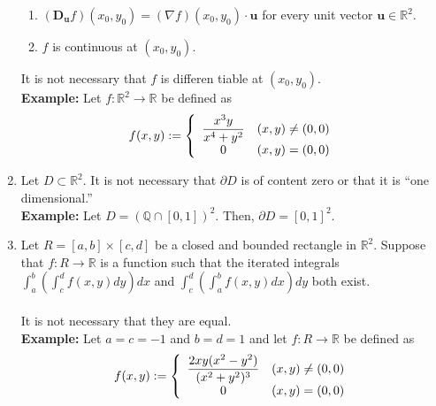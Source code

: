 \documentclass{article}
\begin{document}
\begin{enumerate}
\begin{enumerate}[nosep]
		\item $(\mathbf{D_u}f)(x_0, y_0) = (\nabla f)(x_0, y_0)\cdot\mathbf{u}$ for every unit vector $\mathbf{u} \in \mathbb{R}^2.$
		\item $f$ is continuous at $(x_0, y_0).$
	\end{enumerate}
	It is not necessary that $f$ is differen		tiable at $(x_0, y_0).$\\
	\textbf{Example:} Let $f:\mathbb{R}^2 \to \mathbb{R}$ be defined as
	\[f(x, y) := \left\{
	\begin{array}{c c}
		\dfrac{x^3y}{x^4 + y^2} & (x, y) \neq (0, 0)\\
		0 & (x, y) = (0, 0)	
	\end{array}
	\right.\]
	\item Let $D \subset \mathbb{R}^2.$ It is not necessary that $\partial D$ is of content zero or that it is ``one dimensional.''\\
	\textbf{Example:} Let $D = (\mathbb{Q}\cap[0, 1])^2.$ Then, $\partial D = [0, 1]^2.$
	\item Let $R = [a, b] \times[c, d]$ be a closed and bounded rectangle in $\mathbb{R}^2.$ Suppose that $f:R\to\mathbb{R}$ is a function such that the iterated integrals $\displaystyle\int_{a}^{b} \left(\int_{c}^{d} f(x, y) dy\right) dx $ and $\displaystyle\int_{c}^{d} \left(\int_{a}^{b} f(x, y) dx\right) dy $ both exist.\\~\\
	It is not necessary that they are equal.\\
	\textbf{Example:} Let $a = c = - 1$ and $b = d = 1$ and let $f:R \to \mathbb{R}$ be defined as
	\[f(x, y) := \left\{
	\begin{array}{c c}
		\dfrac{2xy(x^2 - y^2)}{(x^2 + y^2)^3} & (x, y) \neq (0, 0)\\
		0 & (x, y) = (0, 0)	
	\end{array}
	\right.\]


\end{enumerate}
\end{document}
